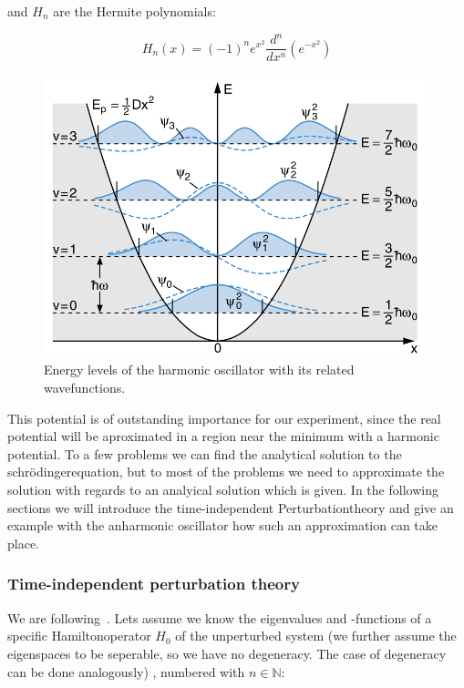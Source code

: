 and $H_n$ are the Hermite polynomials: 

\begin{equation}
    H_n(x)=(-1)^n e^{x^2}\frac{d^n}{dx^n}\left(e^{-x^2}\right) 
\end{equation}

\begin{figure}
    \includegraphics[width=15cm]{pics/harmonic1}
    \caption{Energy levels of the harmonic oscillator with its 
        related wavefunctions\cite{Demtroeder1}.}
    \label{fig:harmonic1}
\end{figure}

This potential is of outstanding importance for our experiment,
since the real potential will be aproximated in a region near
the minimum with a harmonic potential. 
To a few problems we can find the analytical solution
to the schrödingerequation, but to most
of the problems we need to approximate the solution with regards to an analyical
solution which is given. In the following sections we will introduce
the time-independent Perturbationtheory and give an example with the 
anharmonic oscillator how such an approximation can take place.

\subsubsection{Time-independent perturbation theory}
We are following~\cite{fliessbach2008quantenmechanik}.
Lets assume we know the eigenvalues and -functions of a specific
Hamiltonoperator $\hat{H_0}$ of the
unperturbed system (we further assume the eigenspaces to be
seperable, so we have no degeneracy. The case of degeneracy
can be done analogously) 
, numbered with $n\in \mathbb{N}$:

